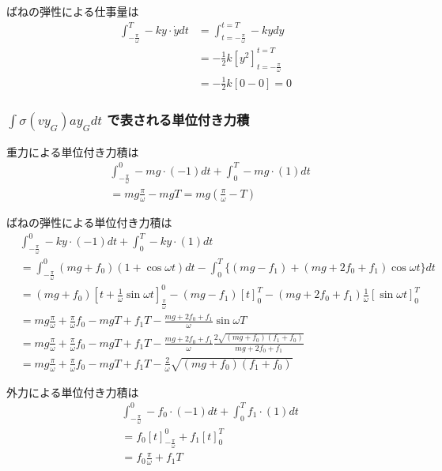 \documentclass[a4paper,11pt]{jsarticle}
\begin{document}
ばねの弾性による仕事量は
\begin{align}
  \int_{-\frac{\pi}{\omega}}^{T} -ky \cdot \dot{y} dt
   & = \int_{t=-\frac{\pi}{\omega}}^{t=T} -ky dy
  \\
   & = -\frac{1}{2}k \left[ y^2 \right]_{t=-\frac{\pi}{\omega}}^{t=T}
  \\
   & = -\frac{1}{2}k \left[ 0 - 0 \right] = 0
\end{align}

\subsubsection{$\int\sigma (vy_G)ay_G dt$ で表される単位付き力積}
重力による単位付き力積は
\begin{align}
   & \int_{-\frac{\pi}{\omega}}^{0} -mg \cdot (-1) dt
  + \int_{0}^{T} -mg \cdot (1) dt
  \\
   & = mg\frac{\pi}{\omega} - mgT = mg\left( \frac{\pi}{\omega} - T\right)
\end{align}

ばねの弾性による単位付き力積は
\begin{align}
   & \int_{-\frac{\pi}{\omega}}^0 -ky \cdot (-1) dt
  + \int_0^T -ky \cdot (1) dt
  \\
   & = \int_{-\frac{\pi}{\omega}}^0 (mg + f_0)( 1 + \cos \omega t ) dt
  - \int_0^T \Big\{ (mg-f_1) + (mg + 2f_0 + f_1)\cos \omega t\Big\} dt
  \\
   & = (mg + f_0)\left[ t + \frac{1}{\omega} \sin \omega t\right]_{\frac{\pi}{\omega}}^0
  - (mg - f_1)\left[ t \right]_0^T
  - (mg + 2f_0 + f_1) \frac{1}{\omega} \left[ \sin \omega t \right]_0^T
  \\
   & = mg\frac{\pi}{\omega} + \frac{\pi}{\omega} f_0
  - mgT + f_1 T
  - \frac{mg + 2f_0 + f_1}{\omega} \sin \omega T
  \\
   & = mg\frac{\pi}{\omega} + \frac{\pi}{\omega} f_0
  - mgT + f_1 T
  - \frac{mg + 2f_0 + f_1}{\omega} \frac{2\sqrt{(mg + f_0)(f_1+f_0)}}{mg + 2f_0 + f_1}
  \\
   & = mg\frac{\pi}{\omega} + \frac{\pi}{\omega} f_0
  - mgT + f_1 T
  - \frac{2}{\omega} \sqrt{(mg + f_0)(f_1+f_0)}
\end{align}

外力による単位付き力積は
\begin{align}
   & \int_{-\frac{\pi}{\omega}}^{0} -f_0 \cdot (-1) dt
  + \int_{0}^{T} f_1 \cdot (1) dt
  \\
   & = f_0 \left[ t \right]_{-\frac{\pi}{\omega}}^{0}
  + f_1 \left[ t \right]_{0}^{T}
  \\
   & = f_0 \frac{\pi}{\omega} + f_1 T
\end{align}
\end{document}
